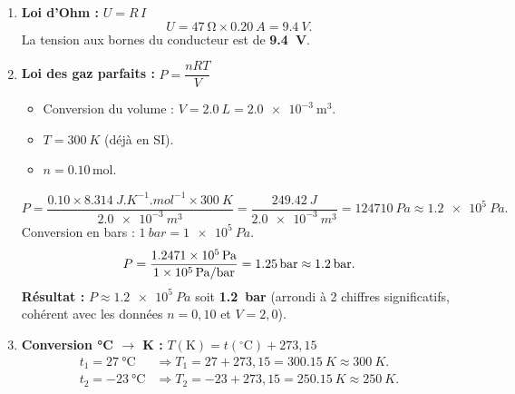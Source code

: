 \documentclass[11pt]{article}
\begin{document}
\begin{corrige}
\begin{enumerate}
\item \textbf{Loi d'Ohm :} $U = R\,I$
      \[
      U = \SI{47}{\ohm} \times \SI{0,20}{A} = \SI{9,4}{V}.
      \]
      La tension aux bornes du conducteur est de \textbf{\SI{9,4}{V}}.
\item \textbf{Loi des gaz parfaits :} $P = \dfrac{nRT}{V}$
      \begin{itemize}
      \item Conversion du volume : $V = \SI{2,0}{L} = \SI{2,0e-3}{\cubic\meter}$.
      \item $T = \SI{300}{K}$ (déjà en SI).
      \item $n = \num{0,10}\,\mathrm{mol}$.
      \end{itemize}
      \[
      P = \frac{\num{0,10} \times \SI{8,314}{J.K^{-1}.mol^{-1}} \times \SI{300}{K}}{\SI{2,0e-3}{m^3}}
      = \frac{\SI{249,42}{J}}{\SI{2,0e-3}{m^3}}
      = \SI{124710}{Pa} \approx \SI{1,2e5}{Pa}.
      \]
      Conversion en bars : $\SI{1}{bar} = \SI{1e5}{Pa}$.
      \[
      P = \frac{\SI{1,2471e5}{Pa}}{\SI{1e5}{Pa/bar}} = \SI{1,25}{bar} \approx \textbf{\SI{1,2}{bar}}.
      \]
      \textbf{Résultat :} $P \approx \SI{1,2e5}{Pa}$ soit \textbf{\SI{1,2}{bar}} (arrondi à 2 chiffres significatifs, cohérent avec les données $n=0,10$ et $V=2,0$).
\item \textbf{Conversion °C $\to$ K :} $T(\mathrm{K}) = t(^\circ\mathrm{C}) + 273,15$
      \begin{align*}
      t_1 = \SI{27}{\degreeCelsius} &\Rightarrow T_1 = 27 + 273,15 = \SI{300,15}{K} \approx \SI{300}{K}. \\
      t_2 = \SI{-23}{\degreeCelsius} &\Rightarrow T_2 = -23 + 273,15 = \SI{250,15}{K} \approx \SI{250}{K}.
      \end{align*}
\end{enumerate}
\end{corrige}
\end{document}
